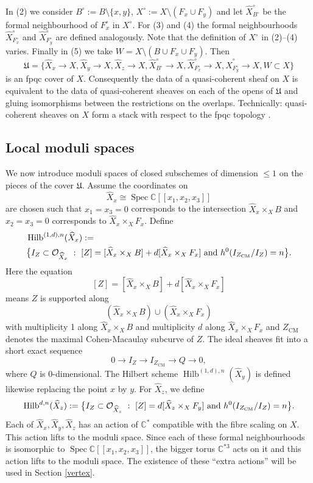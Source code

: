 \documentclass{amsart}
\theoremstyle{definition}
\newcommand{\CC} {\mathbb{C}}          %
\renewcommand{\O}{\mathcal{O}}
\newcommand{\Hilb}{\operatorname{Hilb}}
\newcommand{\CM}{\operatorname{CM}}
\newcommand{\Spec}{\operatorname{Spec}}
\newcommand{\Xhat}{\widehat{X}}
\begin{document}
In (2) we consider $B^\circ := B \setminus \{x,y\}$, $X^\circ := X
\setminus (F_x \cup F_y)$ and let $\Xhat ^{\circ}_{B^\circ}$ be the
formal neighbourhood of $F_{x}^{\circ}$ in $X^\circ$. For (3) and (4)
the formal neighbourhoods $\Xhat ^{\circ}_{F_{x}^{\circ}}$ and $\Xhat
^{\circ}_{F_{y}^{\circ}}$ are defined analogously. Note that the
definition of $X^\circ$ in (2)--(4) varies. Finally in (5) we take $W
= X \setminus (B \cup F_x \cup F_y)$. Then
$$
\mathfrak{U} = \{\Xhat _x \rightarrow X, \Xhat _y \rightarrow X, \Xhat _z \rightarrow X, \Xhat ^{\circ}_{B^\circ} \rightarrow X, \Xhat ^{\circ}_{F_{x}^{\circ}} \rightarrow X, \Xhat ^{\circ}_{F_{y}^{\circ}} \rightarrow X, W \subset X\}
$$
is an fpqc cover of $X$. Consequently the data of a quasi-coherent
sheaf on $X$ is equivalent to the data of quasi-coherent sheaves on
each of the opens of $\mathfrak{U}$ and gluing isomorphisms between
the restrictions on the overlaps. Technically: quasi-coherent sheaves
on $X$ form a stack with respect to the fpqc topology \cite[Vistoli,
Thm.~4.23]{Fundamental-algebraic-geometry}.


\subsection{Local moduli spaces} \label{localmod}

We now introduce moduli spaces of closed subschemes of dimension $\leq 1$ on the pieces of the cover $\mathfrak{U}$. Assume the coordinates on $$\Xhat _x \cong \Spec \CC[\![ x_1,x_2,x_3]\!]$$ are chosen such that $x_1=x_3=0$ corresponds to the intersection $\Xhat _x \times_X B$ and $x_2=x_3=0$ corresponds to $\Xhat _x \times_X F_x$. Define
\begin{align*}
&\Hilb^{(1,d),n}(\Xhat _x) := \\
&\big\{ I_Z \subset \O_{\Xhat _x} \ : \ [Z] = [\Xhat _x \times_X B] + d [\Xhat _x \times_X F_x] \ {\rm{and}} \ h^0(I_{Z_{\CM}} / I_Z) = n \big\}.
\end{align*}
Here the equation
$$
[Z] = [\Xhat _x \times_X B] + d [\Xhat _x \times_X F_x]
$$
means $Z$ is supported along $$(\Xhat _x \times_X B) \cup (\Xhat _x \times_X F_x)$$ with multiplicity 1 along $\Xhat _x \times_X B$ and multiplicity $d$ along $\Xhat _x \times_X F_x$ and $Z_{\CM}$ denotes the maximal Cohen-Macaulay subcurve of $Z$. The ideal sheaves fit into a short exact sequence
$$
0 \longrightarrow I_{Z} \longrightarrow I_{Z_{\CM}} \longrightarrow Q \longrightarrow 0, 
$$
where $Q$ is 0-dimensional. The Hilbert scheme $\Hilb^{(1,d),n}(\Xhat _y)$ is defined likewise replacing the point $x$ by $y$. For $\Xhat _z$, we define
$$
\Hilb^{d,n}(\Xhat _z) := \big\{ I_Z \subset \O_{\Xhat _z} \ : \ [Z] = d [\Xhat _z \times_X F_y] \ {\rm{and}} \ h^0(I_{Z_{\CM}} / I_Z) = n \big\}.
$$
Each of $\Xhat _x, \Xhat _y, \Xhat _z$ has an action of $\CC^*$ compatible with the fibre scaling on $X$. This action lifts to the moduli space. Since each of these formal neighbourhoods is isomorphic to $\Spec \CC[\![x_1,x_2,x_3]\!]$, the bigger torus $\CC^{*3}$ acts on it and this action lifts to the moduli space. The existence of these ``extra actions'' will be used in Section \ref{vertex}.
\end{document}
